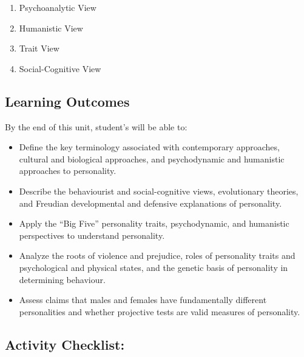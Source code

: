 \documentclass[
]{book}
\providecommand{\tightlist}{%
  \setlength{\itemsep}{0pt}\setlength{\parskip}{0pt}}
\begin{document}
\begin{enumerate}
\def\labelenumi{\arabic{enumi}.}
\tightlist
\item
  Psychoanalytic View\\
\item
  Humanistic View\\
\item
  Trait View\\
\item
  Social-Cognitive View
\end{enumerate}

\hypertarget{learning-outcomes-4}{%
\subsection*{Learning Outcomes}\label{learning-outcomes-4}}

By the end of this unit, student's will be able to:

\begin{itemize}
\tightlist
\item
  Define the key terminology associated with contemporary approaches, cultural and biological approaches, and psychodynamic and humanistic approaches to personality.\\
\item
  Describe the behaviourist and social-cognitive views, evolutionary theories, and Freudian developmental and defensive explanations of personality.\\
\item
  Apply the ``Big Five'' personality traits, psychodynamic, and humanistic perspectives to understand personality.\\
\item
  Analyze the roots of violence and prejudice, roles of personality traits and psychological and physical states, and the genetic basis of personality in determining behaviour.\\
\item
  Assess claims that males and females have fundamentally different personalities and whether projective tests are valid measures of personality.
\end{itemize}

\hypertarget{activity-checklist-4}{%
\subsection*{Activity Checklist:}\label{activity-checklist-4}}
\end{document}
